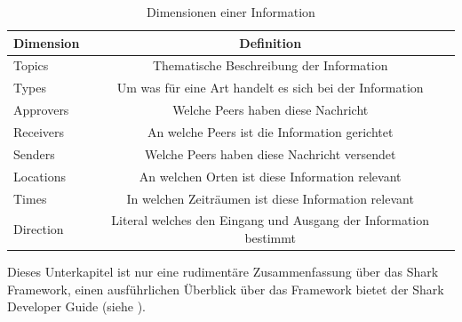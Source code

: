 \begin{table}[H]
	\begin{center}
		\caption{Dimensionen einer Information}
		\label{tab:dimensions}
		\begin{tabular}{l|c} 			
			Dimension & Definition \\
			\hline
			Topics & Thematische Beschreibung der Information\\
			Types & Um was für eine Art handelt es sich bei der Information\\
			Approvers & Welche Peers haben diese Nachricht \\
			Receivers & An welche Peers ist die Information gerichtet\\
			Senders & Welche Peers haben diese Nachricht versendet\\
			Locations & An welchen Orten ist diese Information relevant\\
			Times & In welchen Zeiträumen ist diese Information relevant\\
			Direction & Literal welches den Eingang und Ausgang der Information bestimmt\\
		\end{tabular}
	\end{center}
\end{table}
Dieses Unterkapitel ist nur eine rudimentäre Zusammenfassung über das Shark Framework, einen ausführlichen Überblick über das Framework bietet der Shark Developer \mbox{Guide} (siehe \citet[S. 7ff]{Schwotzer2014}).
